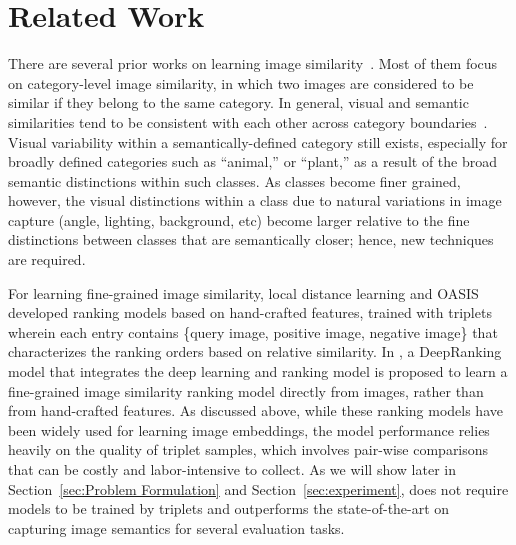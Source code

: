 \documentclass[sigconf]{acmart}
\begin{document}
\section{Related Work}
\label{sec:related_work}
There are several prior works on learning image similarity~\cite{wang2009learning,guillaumin2009tagprop,taylor2011learning}. Most of them focus on category-level image similarity, 
in which two images are considered to be similar if they belong to the same category. In general, visual and semantic similarities tend to be consistent with each other across category boundaries~\cite{deselaers2011visual}.  Visual variability within a semantically-defined category still exists, especially for broadly defined categories such as ``animal,'' or ``plant,''  as a result of the broad semantic distinctions within such classes.  As classes become finer grained, however, the visual distinctions within a class due to natural variations in image capture (angle, lighting, background, etc) become larger relative to the fine distinctions between  classes that are semantically closer; hence, new techniques are required.

For learning fine-grained image similarity, local distance learning \cite{frome2007image} and OASIS \cite{chechik2010large} developed ranking models based on hand-crafted features, trained with triplets wherein each entry contains \{query image, positive image, negative image\} that characterizes the ranking orders based on relative similarity. In \cite{wang2014learning}, a DeepRanking model that integrates the deep learning and ranking model is proposed to learn a fine-grained image similarity ranking model directly from images, rather than from hand-crafted features. As discussed above, while these ranking models have been widely used for learning image embeddings, the model performance relies heavily on the quality of triplet samples, which involves pair-wise comparisons that can be costly and labor-intensive to collect. As we will show later in Section~\ref{sec:Problem Formulation} and Section~\ref{sec:experiment}, {\ourmodel} does not require models to be trained by triplets and outperforms the state-of-the-art on capturing image semantics for several evaluation tasks. 
\end{document}
